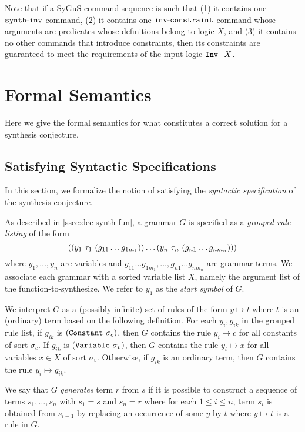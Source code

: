 \documentclass[english,a4paper,10pt]{article}
\begin{document}
Note that if a SyGuS command sequence is such that
(1) it contains one ${\tt synth\mbox{-}inv}$ command,
(2) it contains one ${\tt inv\mbox{-}constraint}$ command whose arguments are predicates whose definitions belong to logic $X$,
and (3) it contains no other commands that introduce constraints,
then its constraints are guaranteed to meet the requirements of the input logic ${\tt Inv\_}X$.

\section{Formal Semantics}
\label{sec:logical-semantics}

Here we give the formal semantics
for what constitutes a correct solution for a synthesis conjecture.

\subsection{Satisfying Syntactic Specifications}
\label{ssec:sat-syntactic}

In this section,
we formalize the notion of satisfying the \emph{syntactic specification}
of the synthesis conjecture.

As described in \cref{ssec:dec-synth-fun},
a grammar $G$ is specified as
a \emph{grouped rule listing} of the form
\[
{\tt (}{\tt (}y_1\mbox{ }\tau_1\mbox{ }{\tt (}g_{11} \ldots g_{1m_1} {\tt )} {\tt )} \ldots 
{\tt (}y_n\mbox{ }\tau_n\mbox{ }{\tt (}g_{n1} \ldots g_{nm_n} {\tt )} {\tt )}{\tt )}
\]
where $y_1, \ldots, y_n$ are variables
and $g_{11} \ldots g_{1m_1}, \ldots, g_{n1} \ldots g_{nm_n}$
are grammar terms.
We associate each grammar with a sorted variable list $X$,
namely the argument list of the function-to-synthesize.
We refer to $y_1$ as the \emph{start symbol} of $G$.

We interpret $G$ as a (possibly infinite) set of rules 
of the form $y \mapsto t$ where $t$ is an (ordinary) term
based on the following definition.
For each $y_i, g_{ik}$ in the grouped rule list,
if $g_{ik}$ is ${\tt (}{\tt Constant}\mbox{ }\sigma_c{\tt )}$,
then $G$ contains the rule $y_i \mapsto c$ for all constants of sort $\sigma_c$.
If $g_{ik}$ is ${\tt (}{\tt Variable}\mbox{ }\sigma_v{\tt )}$,
then $G$ contains the rule $y_i \mapsto x$
for all variables $x \in X$ of sort $\sigma_v$.
Otherwise, if $g_{ik}$ is an ordinary term,
then $G$ contains the rule $y_i \mapsto g_{ik}$.

We say that $G$ \emph{generates} term $r$ from $s$
if it is possible to construct a sequence of terms
$s_1, \ldots, s_n$
with $s_1 = s$ and $s_n = r$
where for each $1 \leq i \leq n$, term $s_i$ is obtained from $s_{i-1}$ by
replacing an occurrence of some $y$ by $t$
where $y \mapsto t$ is a rule in $G$.
\end{document}
